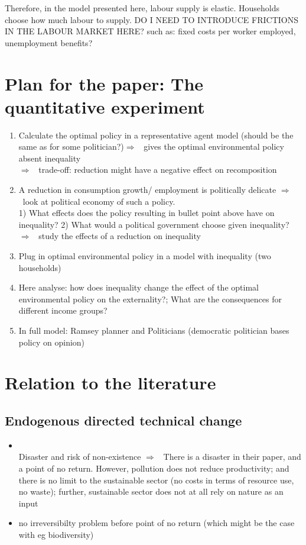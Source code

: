 \documentclass[12pt]{article}
\newcommand{\ar}{$\Rightarrow$ \ }
\begin{document}
Therefore, in the model presented here, labour supply is elastic. Households choose how much labour to supply. DO I NEED TO INTRODUCE FRICTIONS IN THE LABOUR MARKET HERE? such as: fixed costs per worker employed, unemployment benefits? 



\section{Plan for the paper: The quantitative experiment}
\begin{enumerate}
\item Calculate the optimal policy in a representative agent model (should be the same as for some politician?)\ar gives the optimal environmental policy absent inequality\\
\ar trade-off: reduction might have a negative effect on recomposition


\item A reduction in consumption growth/ employment is politically delicate \ar look at political economy of such a policy. \\
1) What effects does the policy resulting in bullet point above have on inequality?
2) What would a political government choose given inequality? 
\ar study the effects of a reduction on inequality

\item Plug in optimal environmental policy in a model with inequality (two households) 
\item Here analyse: how does inequality change the effect of the optimal environmental policy on the externality?; What are the consequences for different income groups?
\item In full model: Ramsey planner and Politicians (democratic politician bases policy on opinion) 
\end{enumerate}

\section{Relation to the literature}
\subsection{Endogenous directed technical change}
\begin{itemize}
	\item \cite{Acemoglu2012TheChange}\\
	Disaster and risk of non-existence \ar There is a disaster in their paper, and a point of no return. However, pollution does not reduce productivity; and there is no limit to the sustainable sector (no costs in terms of resource use, no waste); further, sustainable sector does not at all rely on nature as an input
	\item no irreversibilty problem before point of no return (which might be the case with eg biodiversity)
\end{itemize} 
\end{document}

